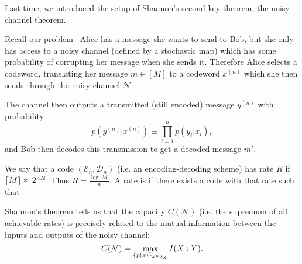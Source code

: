 Last time, we introduced the setup of Shannon's second key theorem, the noisy channel theorem.

Recall our problem-- Alice has a message she wants to send to Bob, but she only has access to a noisy channel (defined by a stochastic map) which has some probability of corrupting her message when she sends it. Therefore Alice selects a codeword, translating her message $m\in [M]$ to a codeword $x^{(n)}$ which she then sends through the noisy channel $\mathcal{N}$.

The channel then outputs a transmitted (still encoded) message $y^{(n)}$ with probability
\begin{equation}
    p(y^{(n)}|x^{(n)}) \equiv \prod_{i=1}^n p(y_i| x_i),
\end{equation}
and Bob then decodes this transmission to get a decoded message $m'$.

We say that a code $(\mathcal{E}_n,\mathcal{D}_n)$ (i.e. an encoding-decoding scheme) has rate $R$ if $\lceil M\rceil\approx 2^{nR}$. Thus $R =\frac{\log |M|}{n}$. A rate is  if there exists a code with that rate such that 

Shannon's theorem tells us that the capacity $C(\mathcal{N})$ (i.e. the supremum of all achievable rates) is precisely related to the mutual information between the inputs and outputs of the noisy channel:
\begin{equation}
    C(\mathcal{N})=\max_{\{p(x)\}_{x\in J_X}} I(X: Y).
\end{equation}

